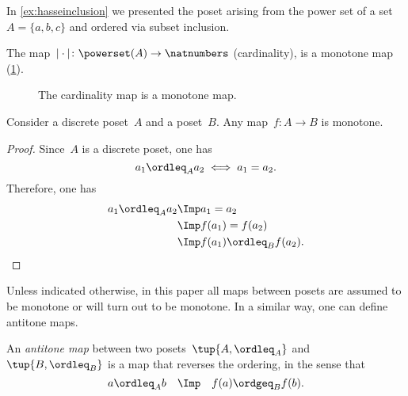 
\begin{example}
\end{example}

\begin{example}
  In \cref{ex:hasseinclusion} we presented the poset arising from the power set of a set~$A=\{a,b,c\}$ and ordered via subset inclusion.

  The map~$\vert \cdot \vert \colon \powerset(A)\to \natnumbers$ (cardinality), is a monotone map (\cref{fig:cardinality}).
  \begin{figure}[h!]
    \begin{center}
    \end{center}
    \caption{The cardinality map is a monotone map. \label{fig:cardinality}}
  \end{figure}
\end{example}

\begin{lemma}
  Consider a discrete poset~$A$ and a poset~$B$. Any map~$f\colon A\to B$ is monotone.
\end{lemma}
\begin{proof}
  Since~$A$ is a discrete poset, one has
  \begin{equation}
    a_1\ordleq_A a_2 \iff a_1=a_2.
  \end{equation}
  Therefore, one has
  \begin{equation}
    \begin{aligned}
      a_1\ordleq_A a_2 &\Imp a_1=a_2\\
      &\Imp f(a_1)=f(a_2)\\
      &\Imp f(a_1)\ordleq_B f(a_2).
    \end{aligned}
  \end{equation}
\end{proof}
Unless indicated otherwise, in this paper all maps between posets are assumed to be monotone or will turn out to be monotone. In a similar way, one can define antitone maps.
\begin{definition}
  An \emph{antitone map} between two posets~$\tup{A, \ordleq_A}$ and~$\tup{B, \ordleq_B}$ is a map that reverses the ordering, in the sense that
  \begin{equation}
    a \ordleq_A b \quad \Imp \quad f(a) \ordgeq_B f(b).
  \end{equation}
\end{definition}

